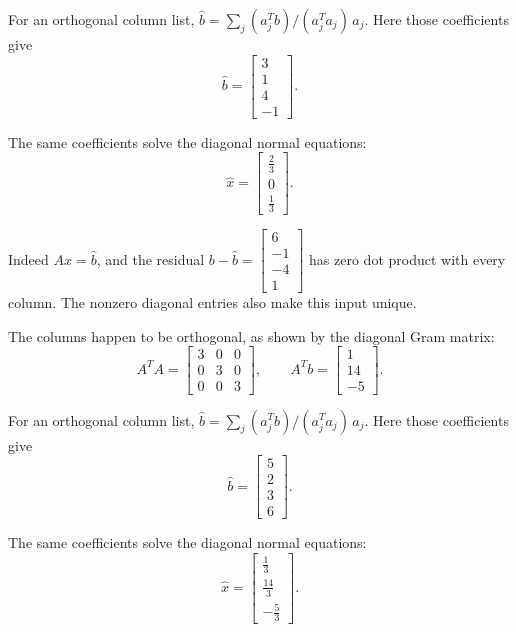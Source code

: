 For an orthogonal column list, $\widehat b=\sum_j(a_j^Tb)/(a_j^Ta_j)\,a_j$. Here those coefficients give
\[ \widehat b=\begin{bmatrix}3\\1\\4\\-1\end{bmatrix}.\]

The same coefficients solve the diagonal normal equations:
\[ \widehat x=\begin{bmatrix}\frac{2}{3}\\0\\\frac{1}{3}\end{bmatrix}.\]

Indeed $A\widehat x=\widehat b$, and the residual $b-\widehat b=\begin{bmatrix}6\\-1\\-4\\1\end{bmatrix}$ has zero dot product with every column. The nonzero diagonal entries also make this input unique.

The columns happen to be orthogonal, as shown by the diagonal Gram matrix:
\[ A^TA=\begin{bmatrix}3 & 0 & 0\\0 & 3 & 0\\0 & 0 & 3\end{bmatrix},\qquad A^Tb=\begin{bmatrix}1\\14\\-5\end{bmatrix}.\]

For an orthogonal column list, $\widehat b=\sum_j(a_j^Tb)/(a_j^Ta_j)\,a_j$. Here those coefficients give
\[ \widehat b=\begin{bmatrix}5\\2\\3\\6\end{bmatrix}.\]

The same coefficients solve the diagonal normal equations:
\[ \widehat x=\begin{bmatrix}\frac{1}{3}\\\frac{14}{3}\\- \frac{5}{3}\end{bmatrix}.\]

